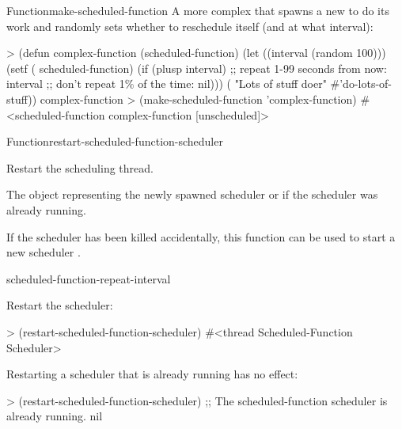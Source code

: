 \begin{functiondoc}{Function}{make-scheduled-function}{ 
     
    \returns{} }
%
%
%
A more complex  that spawns a new  to
do its work and randomly sets whether to reschedule itself (and at what
interval):
%
\W\supp
\begin{example}
> (defun complex-function (scheduled-function)
    (let ((interval (random 100)))
      (setf ( scheduled-function)
            (if (plusp interval) 
                ;; repeat 1-99 seconds from now:
                interval
                ;; don't repeat 1\% of the time:
                nil)))
    ( "Lots of stuff doer" #'do-lots-of-stuff))
complex-function
> (make-scheduled-function 'complex-function)
#<scheduled-function complex-function [unscheduled]>
\end{example}

\end{functiondoc}


\begin{functiondoc}{Function}{restart-scheduled-function-scheduler}%
  {\noargs{} \returns{} }
%

\fnsyntax

\fnpurpose Restart the  scheduling thread.

\fnpackage {}

\fnmodule {}

\fnreturns The object representing the newly spawned
 scheduler  or \nil{} if the
 scheduler was already running.

\fnerrors
\nothreads{}

\fndescription If the  scheduler  has
been killed accidentally, this function can be used to start a new scheduler
.

\begin{alsos}{scheduled-function-repeat-interval}
\end{alsos}

\fnexamples
Restart the  scheduler:
%
\W\supp
\begin{example}
> (restart-scheduled-function-scheduler)
#<thread Scheduled-Function Scheduler>
\end{example}
%
Restarting a  scheduler that is already running has
no effect:
%
\W\supp\notpretop
\begin{example}
> (restart-scheduled-function-scheduler)
;; The scheduled-function scheduler is already running.
nil
\end{example}

\end{functiondoc}

